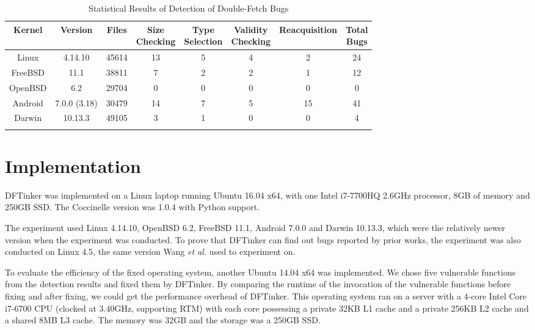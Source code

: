 \documentclass[10pt]{llncs}
\begin{document}
\begin{table}[t]
  \centering
  \caption{Statistical Results of Detection of Double-Fetch Bugs}
  \begin{tabular}{cccccccc}
    \hline
    Kernel & Version & Files & \makecell{Size \\ Checking} & \makecell{Type \\ Selection} & \makecell{Validity \\ Checking} & Reacquisition & \makecell{Total \\ Bugs}\\    
    \hline
    Linux & 4.14.10 & 45614 & 13 & 5 & 4 & 2 & 24 \\
    FreeBSD & 11.1 & 38811 & 7 & 2 & 2 & 1 & 12 \\
    OpenBSD & 6.2 & 29704 & 0 & 0 & 0 & 0 & 0 \\
    Android & 7.0.0 (3.18) & 30479 & 14 & 7 & 5 & 15 & 41 \\
    Darwin & 10.13.3 & 49105 & 3 & 1 & 0 & 0 & 4 \\
    \hline
    \label{stat}
  \end{tabular}
\end{table}




\section{Implementation}%
\label{imple}
DFTinker was implemented on a Linux laptop running Ubuntu 16.04 x64, with one Intel i7-7700HQ 2.6GHz processor, 8GB of memory and 250GB SSD. The Coccinelle version was 1.0.4 with Python support.

The experiment used Linux 4.14.10, OpenBSD 6.2, FreeBSD 11.1, Android 7.0.0 and Darwin 10.13.3, which were the relatively newer version when the experiment was conducted. To prove that DFTinker can find out bugs reported by prior works, the experiment was also conducted on Linux 4.5, the same version Wang \textit{et al.} used to experiment on.

To evaluate the efficiency of the fixed operating system, another Ubuntu 14.04 x64 was implemented. We chose five vulnerable functions from the detection results and fixed them by DFTinker. By comparing the runtime of the invocation of the vulnerable functions before fixing and after fixing, we could get the performance overhead of DFTinker. This operating system ran on a server with a 4-core Intel Core i7-6700 CPU (clocked at 3.40GHz, supporting RTM) with each core possessing a private 32KB L1 cache and a private 256KB L2 cache and a shared 8MB L3 cache. The memory was 32GB and the storage was a 250GB SSD.
\end{document}
